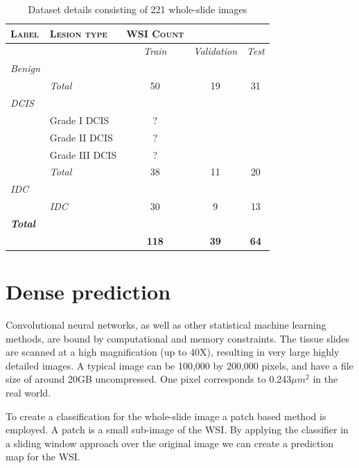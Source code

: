 \documentclass[journal]{IEEEtran}
\begin{document}
\begin{table}[!t]
\renewcommand{\arraystretch}{1.05}
\caption{Dataset details consisting of 221 whole-slide images}
\label{table_dataset}
\centering
\begin{tabular}{|llccc|}
\hline
\textsc{Label}&\textsc{Lesion type}&\hspace{-0.4cm}\textsc{WSI Count}&&\\
\hline
&&\textit{Train}&\hspace{-0.24cm}\textit{Validation}&\textit{Test}\\
\textit{Benign}&&&&\\
&\textit{Total}& 50&19&31\\

\textit{DCIS}&&&&\\
&Grade I DCIS&  ?&&\\
&Grade II DCIS& ?&&\\
&Grade III DCIS& ?&&\\
&\textit{Total}& 38&11&20\\
\textit{IDC}&&&&\\
&\textit{IDC}& 30&9&13\\


\textit{\textbf{Total}}&&&&\\
&&\textbf{118}&\textbf{39}&\textbf{64}\\
\hline
\end{tabular}
\end{table}




\section{Dense prediction}


Convolutional neural networks, as well as other statistical machine learning methods, are bound by computational and memory constraints. The tissue slides are scanned at a high magnification (up to 40X), resulting in very large highly detailed images. A typical image can be 100,000 by 200,000 pixels, and have a file size of around 20GB uncompressed. One pixel corresponds to 0.243${\mu}m^2$ in the real world.

To create a classification for the whole-slide image a patch based method is employed. A patch is a small sub-image of the WSI. By applying the classifier in a sliding window approach over the original image we can create a prediction map for the WSI.
\end{document}
